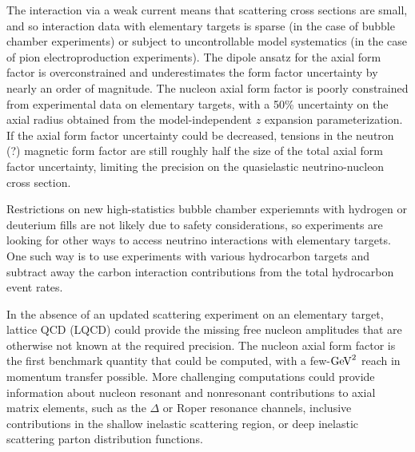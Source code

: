 The interaction via a weak current means that scattering cross sections are small,
 and so interaction data with elementary targets is sparse
 (in the case of bubble chamber experiments)
 or subject to uncontrollable model systematics
 (in the case of pion electroproduction experiments).
The dipole ansatz for the axial form factor is overconstrained
 and underestimates the form factor uncertainty by nearly an order of magnitude.
The nucleon axial form factor is poorly constrained from experimental data
 on elementary targets, with a 50\% uncertainty on the axial radius
 obtained from the model-independent $z$ expansion parameterization.
If the axial form factor uncertainty could be decreased,
 tensions in the neutron (?) magnetic form factor are still
 roughly half the size of the total axial form factor uncertainty,
 limiting the precision on the quasielastic neutrino-nucleon cross section.

Restrictions on new high-statistics bubble chamber experiemnts with
 hydrogen or deuterium fills are not likely due to safety considerations,
 so experiments are looking for other ways to access neutrino interactions
 with elementary targets.
One such way is to use experiments with various hydrocarbon targets
 and subtract away the carbon interaction contributions from
 the total hydrocarbon event rates.

In the absence of an updated scattering experiment on an elementary target,
 lattice QCD (LQCD) could provide the missing free nucleon amplitudes
 that are otherwise not known at the required precision.
The nucleon axial form factor is the first benchmark quantity that could be computed,
 with a few-${\rm GeV}^2$ reach in momentum transfer possible.
More challenging computations could provide information about nucleon
 resonant and nonresonant contributions to axial matrix elements,
 such as the $\Delta$ or Roper resonance channels,
 inclusive contributions in the shallow inelastic scattering region,
 or deep inelastic scattering parton distribution functions.


